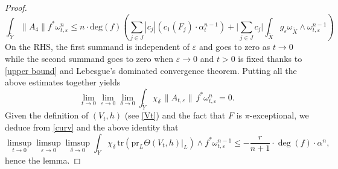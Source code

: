 \documentclass[12pt]{amsart}
\theoremstyle{definition}
\newcommand{\tX}{\widetilde{X}}
\newcommand{\tY}{\widetilde{Y}}
\numberwithin{equation}{section}
\newcommand{\ep}{\varepsilon}
\begin{document}
\begin{proof}
\[\int_{\tY} \|A_4\|f^*\omega_{t,\ep}^n \le  n\cdot \mathrm{deg}(f) \left(\sum_{j\in J}|c_j| (c_1(F_j) \cdot \alpha_t^{n-1})+\Big| \sum_{j\in J} c_j \Big| \int_{\tX} g_\ep \omega_{\tX} \wedge \omega_{t,\ep}^{n-1}\right)\]
On the RHS, the first summand is independent of $\ep$ and goes to zero as $t\to 0$ while the second summand goes to zero when $\ep \to 0$ and $t>0$ is fixed thanks to \eqref{upper bound} and Lebesgue's dominated convergence theorem. Putting all the above estimates together  yields 
\[ \lim_{t\to 0} \lim_{\ep \to 0} \lim_{\delta \to 0} \int_{\tY} \chi_\delta \, \| A_{t,\ep}\| \, f^*\omega_{t,\ep}^{n} =0.\]
Given the definition of $(V_t,h)$ (see \eqref{Vt}) and the fact that $F$ is $\pi$-exceptional, we deduce from \eqref{curv} and the above identity that 
\[\limsup_{t\to 0} \limsup_{\ep \to 0} \limsup_{\delta \to 0} \int_{\tY} \chi_\delta \, \mathrm{tr}(\mathrm{pr}_L \Theta(V_t, h)|_L) \wedge f^*\omega_{t,\ep}^{n-1}\le-\frac{r}{n+1}\cdot \deg(f) \cdot \alpha^n,\]
hence the lemma.
\end{proof}
\end{document}
